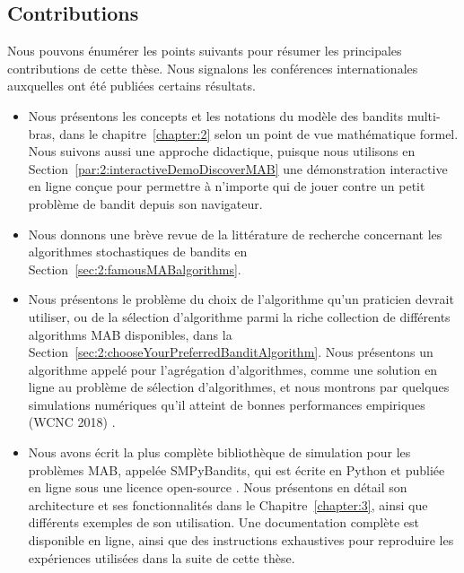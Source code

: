 \begin{resume_fr}
\section*{Contributions}

Nous pouvons énumérer les points suivants pour résumer les principales contributions de cette thèse.
Nous signalons les conférences internationales auxquelles ont été publiées certains résultats.

\begin{itemize}
    \item
    Nous présentons les concepts et les notations du modèle des bandits multi-bras, dans le chapitre~\ref{chapter:2} selon un point de vue mathématique formel.
    Nous suivons aussi une approche didactique, puisque nous utilisons en Section~\ref{par:2:interactiveDemoDiscoverMAB} une démonstration interactive en ligne conçue pour permettre à n'importe qui de jouer contre un petit problème de bandit depuis son navigateur.

    \item
    Nous donnons une brève revue de la littérature de recherche concernant les algorithmes stochastiques de bandits en Section~\ref{sec:2:famousMABalgorithms}.

    \item
    Nous présentons le problème du choix de l'algorithme qu'un praticien devrait utiliser, ou de la sélection d'algorithme parmi la riche collection de différents algorithms MAB disponibles, dans la Section~\ref{sec:2:chooseYourPreferredBanditAlgorithm}.
    Nous présentons un algorithme appelé \Aggr{} pour l'agrégation d'algorithmes, comme une solution en ligne au problème de sélection d'algorithmes, et nous montrons par quelques simulations numériques qu'il atteint de bonnes performances empiriques
    (WCNC 2018) \cite{Besson2018WCNC}.

    \item
    Nous avons écrit la plus complète bibliothèque de simulation pour les problèmes MAB, appelée SMPyBandits, qui est écrite en Python et publiée en ligne sous une licence open-source \cite{SMPyBandits,SMPyBanditsJMLR}.
    Nous présentons en détail son architecture et ses fonctionnalités dans le Chapitre~\ref{chapter:3}, ainsi que différents exemples de son utilisation.
    Une documentation complète est disponible en ligne, ainsi que des instructions exhaustives pour reproduire les expériences utilisées dans la suite de cette thèse.


\end{itemize}
\end{resume_fr}
